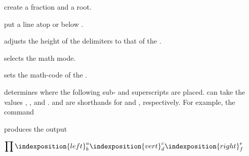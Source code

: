 \begin{code}
\cs{\frac}  

\cs{\genfrac}     

\cs{\sqrt} 
\end{code}
create a fraction and a root.
\begin{code}
  \cs{\overline} 

  \cs{\underline} 
\end{code}
put a line atop or below .
\begin{code}
\cs{\left}   \cs{\middle}  \cs{\right} 
\end{code}
adjusts the height of the delimiters to that of the .
\begin{code}
  \cs{\displaystyle}

  \cs{\textstyle}

  \cs{\scriptstyle}

  \cs{\scriptscriptstyle}
\end{code}
selects the math mode.
\begin{code}
  \cs{\mathord} 

  \cs{\mathop} 

  \cs{\mathbin} 

  \cs{\mathrel} 

  \cs{\mathopen} 

  \cs{\mathclose} 

  \cs{\mathpunct} 

  \cs{\mathinner} 
\end{code}
sets the math-code of the .
\begin{code}
  \cs{\indexposition} 

  \cs{\limits}

  \cs{\nolimits}
\end{code}
determines where the following sub- and superscripts are placed.  can take the values
, , and . \cs{\limits} and \cs{\nolimits} are shorthands for
 and , respectively.
For example, the command
\begin{code}\small
\end{code}
produces the output
\begin{display}
  \centering
  $\displaystyle \prod\indexposition{left}^a_b\indexposition{vert}^c_d\indexposition{right}^e_f$
\end{display}

